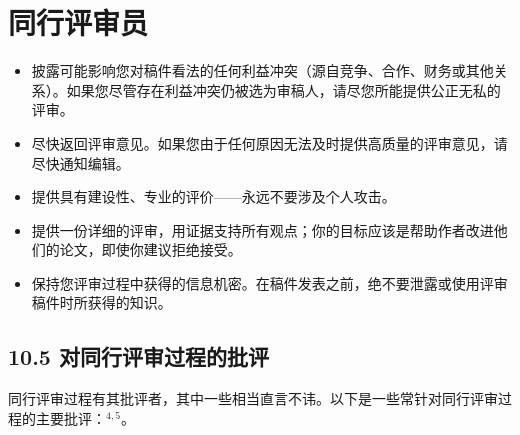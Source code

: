 \section*{同行评审员}
\begin{itemize}
\item 披露可能影响您对稿件看法的任何利益冲突（源自竞争、合作、财务或其他关系）。如果您尽管存在利益冲突仍被选为审稿人，请尽您所能提供公正无私的评审。
\item 尽快返回评审意见。如果您由于任何原因无法及时提供高质量的评审意见，请尽快通知编辑。
\item 提供具有建设性、专业的评价——永远不要涉及个人攻击。
\item 提供一份详细的评审，用证据支持所有观点；你的目标应该是帮助作者改进他们的论文，即使你建议拒绝接受。
\item 保持您评审过程中获得的信息机密。在稿件发表之前，绝不要泄露或使用评审稿件时所获得的知识。
\end{itemize}

\subsection*{10.5 对同行评审过程的批评}
同行评审过程有其批评者，其中一些相当直言不讳。以下是一些常针对同行评审过程的主要批评：${ }^{4,5}$。

